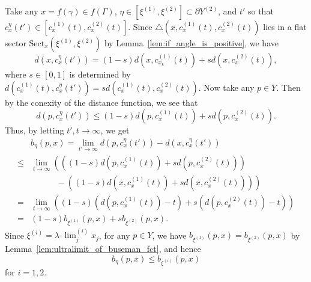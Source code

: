 \documentclass[12pt]{amsart}
\numberwithin{equation}{section}
\theoremstyle{plain}
\theoremstyle{definition}
\theoremstyle{remark}
\newcommand{\uulim}[1][]{\lambda{\text{-}}\!{\lim}^{(#1)}}
\newcommand{\xxi}[1]{\xi^{(#1)}}
\newcommand{\cc}[2]{c_{#1}^{#2}}
\newcommand{\tri}[3]{\triangle(#1,#2,#3)}
\newcommand{\sect}[3][]{\mathrm{Sect}_{#1}(#2,#3)}
\begin{document}
%
%
 Take any $x =f(\gamma) \in f(\Gamma)$, 
 $\eta \in [\xxi{1},\xxi{2}] \subset \partial Y^{(2)}$, and 
 $t'$ so that 
 $\cc{x}{\eta}(t') \in [\cc{x}{(1)}(t),\cc{x}{(2)}(t)]$. 
 Since $\tri{x}{\cc{x}{(1)}(t)}{\cc{x}{(2)}(t)}$ lies in a flat
 sector $\sect[x]{\xxi{1}}{\xxi{2}}$ by
 Lemma~\ref{lem:if_angle_is_positive},  we have
\begin{equation*}
 d(x,\cc{x}{\eta}(t')) = (1-s)d(x,\cc{x_k}{(1)}(t))
 + s d(x,\cc{x}{(2)}(t)), 
\end{equation*}
 where $s\in [0,1]$ is determined by 
 $d(\cc{x}{(1)}(t),\cc{x}{\eta}(t'))=s
 d(\cc{x}{(1)}(t),\cc{x}{(2)}(t))$. 
 Now take any $p \in Y$. 
 Then by the conexity of the distance function, we see that 
\begin{equation*}
 d(p,\cc{x}{\eta}(t')) \leq
 (1-s)d(p,\cc{x}{(1)}(t)) + s d(p,\cc{x}{(2)}(t)). 
\end{equation*}
 Thus, by letting $t',t\to \infty$, we get
\begin{equation*}
\begin{split}
  & b_{\eta}(p, x)  = \lim_{t'\to \infty}
  d(p,\cc{x}{\eta}(t'))-d(x,\cc{x}{\eta}(t')) \\
 \leq & \lim_{t\to \infty} \left(\left(
 (1-s)d(p,\cc{x}{(1)}(t)) + sd(p,\cc{x}{(2)}(t))\right) \right.\\
 & \left. \phantom{\lim_{t\to \infty} \ \ } -
  \left((1-s)d(x,\cc{x}{(1)}(t))+sd(x,\cc{x}{(2)}(t))\right) \right)\\
 =& \lim_{t\to \infty}\left(
 (1-s) \left(d(p,\cc{x}{(1)}(t)) -t \right)
  + s\left(d(p,\cc{x}{(2)}(t))-t \right)
 \right)\\
 =& (1-s)b_{\xxi{1}}(p,x)+ sb_{\xxi{2}}(p,x). 
\end{split}
\end{equation*}
 Since $\xxi{i}=\uulim[i]_j x_j$, for any $p \in Y$, we have
 $b_{\xxi{1}}(p,x) = b_{\xxi{2}}(p,x)$ by
 Lemma~\ref{lem:ultralimit_of_buseman_fct}, and hence
\begin{equation*}
  b_{\eta}(p, x) \leq b_{\xxi{i}}(p,x)
\end{equation*}
 for $i=1,2$. 
\end{document}
